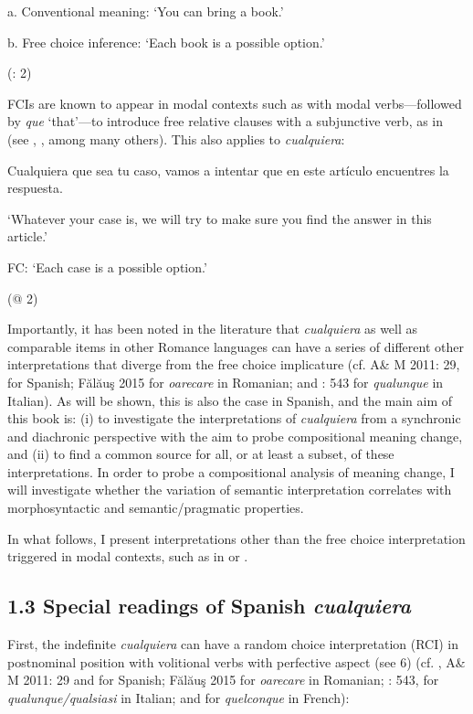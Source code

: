 \documentclass[output=paper]{langscibook}
\begin{document}
    a.  Conventional meaning: ‘You can bring a book.’

    b.  Free choice inference: ‘Each book is a possible option.’

      (\citealt{AloniEtAl2011}: 2)

FCIs are known to appear in modal contexts such as with modal verbs—followed by \textit{que} ‘that’—to introduce free relative clauses with a subjunctive verb, as in  (see \citealt{Quer2000}, \citealt{Giannakidou2001}, among many others). This also applies to \textit{cualquiera}:

    Cualquiera que sea tu caso, vamos a intentar que en este artículo encuentres la respuesta.

    ‘Whatever your case is, we will try to make sure you find the answer in this article.’

    FC: ‘Each case is a possible option.’  

      (@ 2)

Importantly, it has been noted in the literature that \textit{cualquiera} as well as comparable items in other Romance languages can have a series of different other interpretations that diverge from the free choice implicature (cf. A\& M 2011: 29, \citealt{Rivero2011} for Spanish; Fălăuş 2015 for \textit{oarecare} in Romanian; and \citealt{Chierchia2006}: 543 for \textit{qualunque} in Italian). As will be shown, this is also the case in Spanish, and the main aim of this book is: (i) to investigate the interpretations of \textit{cualquiera} from a synchronic and diachronic perspective with the aim to probe compositional meaning change, and (ii) to find a common source for all, or at least a subset, of these interpretations. In order to probe a compositional analysis of meaning change, I will investigate whether the variation of semantic interpretation correlates with morphosyntactic and semantic/pragmatic properties.

  In what follows, I present interpretations other than the free choice interpretation triggered in modal contexts, such as in  or .

\subsection{1.3 Special readings of Spanish \textit{cualquiera}}

First, the indefinite \textit{cualquiera} can have a random choice interpretation (RCI) in postnominal position with volitional verbs with perfective aspect (see 6) (cf. \citealt{ChoiRomero2008}, A\& M 2011: 29 and \citealt{Rivero2011} for Spanish; Fălăuş 2015 for \textit{oarecare} in Romanian; \citealt{Chierchia2006}: 543, \citealt{Kellert2021} for \textit{qualunque/qualsiasi} in Italian; and \citealt{Vlachou2007,Vlachou2012} for \textit{quelconque} in French):
\end{document}
